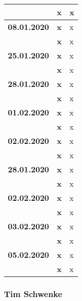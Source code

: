 {\begin{longtable}{|l|l|p{11cm}|}
			& \textbf{\hfill x} & x
		\\ \hline \textbf{08.01.2020}
			& \textbf{\hfill x} & x \\\cline{2-3}
			& \textbf{\hfill x} & x
		\\ \hline \textbf{25.01.2020}
			& \textbf{\hfill x} & x \\\cline{2-3}
			& \textbf{\hfill x} & x
		\\ \hline \textbf{28.01.2020}
			& \textbf{\hfill x} & x \\\cline{2-3}
			& \textbf{\hfill x} & x
		\\ \hline \textbf{01.02.2020}
			& \textbf{\hfill x} & x \\\cline{2-3}
			& \textbf{\hfill x} & x
		\\ \hline \textbf{02.02.2020}
			& \textbf{\hfill x} & x \\\cline{2-3}
			& \textbf{\hfill x} & x
		\\ \hline \textbf{28.01.2020}
			& \textbf{\hfill x} & x \\\cline{2-3}
			& \textbf{\hfill x} & x
		\\ \hline \textbf{02.02.2020}
			& \textbf{\hfill x} & x \\\cline{2-3}
			& \textbf{\hfill x} & x
		\\ \hline \textbf{03.02.2020}
			& \textbf{\hfill x} & x \\\cline{2-3}
			& \textbf{\hfill x} & x
		\\ \hline \textbf{05.02.2020}
			& \textbf{\hfill x} & x \\\cline{2-3}
			& \textbf{\hfill x} & x \\
		\hline\hline
	\end{longtable}
}

\clearpage

\subsubsection{Tim Schwenke}

